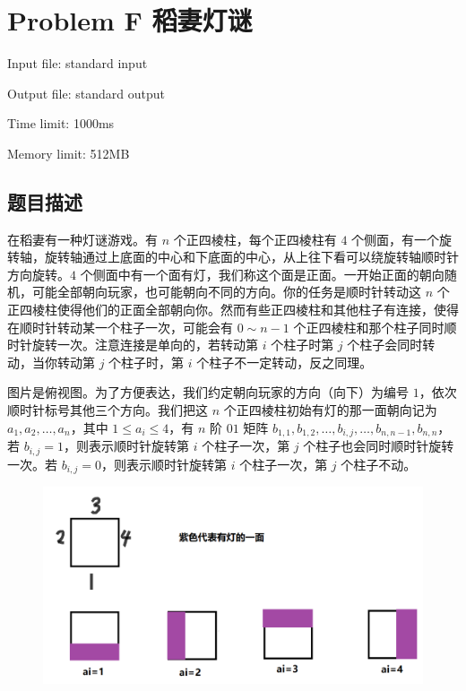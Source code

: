 \newpage
\section{Problem F 稻妻灯谜}
{ \limitfont{}
Input file: standard input \par
Output file: standard output \par
Time limit: 1000ms \par
Memory limit: 512MB \par
}
\subsection*{题目描述}

在稻妻有一种灯谜游戏。有 $n$ 个正四棱柱，每个正四棱柱有 $4$ 个侧面，有一个旋转轴，旋转轴通过上底面的中心和下底面的中心，从上往下看可以绕旋转轴顺时针方向旋转。$4$ 个侧面中有一个面有灯，我们称这个面是正面。一开始正面的朝向随机，可能全部朝向玩家，也可能朝向不同的方向。你的任务是顺时针转动这 $n$ 个正四棱柱使得他们的正面全部朝向你。然而有些正四棱柱和其他柱子有连接，使得在顺时针转动某一个柱子一次，可能会有 $0 \sim n-1$ 个正四棱柱和那个柱子同时顺时针旋转一次。注意连接是单向的，若转动第 $i$ 个柱子时第 $j$ 个柱子会同时转动，当你转动第 $j$ 个柱子时，第 $i$ 个柱子不一定转动，反之同理。

图片是俯视图。为了方便表达，我们约定朝向玩家的方向（向下）为编号 $1$，依次顺时针标号其他三个方向。我们把这 $n$ 个正四棱柱初始有灯的那一面朝向记为 $a_1, a_2, \dots, a_n$，其中 $1 \leq a_i \leq 4$，有 $n$ 阶 $01$ 矩阵 $b_{1,1}, b_{1,2}, \dots, b_{i,j}, \dots, b_{n,n-1}, b_{n,n}$，若 $b_{i,j}=1$，则表示顺时针旋转第 $i$ 个柱子一次，第 $j$ 个柱子也会同时顺时针旋转一次。若 $b_{i,j}=0$，则表示顺时针旋转第 $i$ 个柱子一次，第 $j$ 个柱子不动。

\begin{figure}[H]
    \centering
    \includegraphics[scale=0.6]{./src/Problem-F-1.png}
\end{figure}

